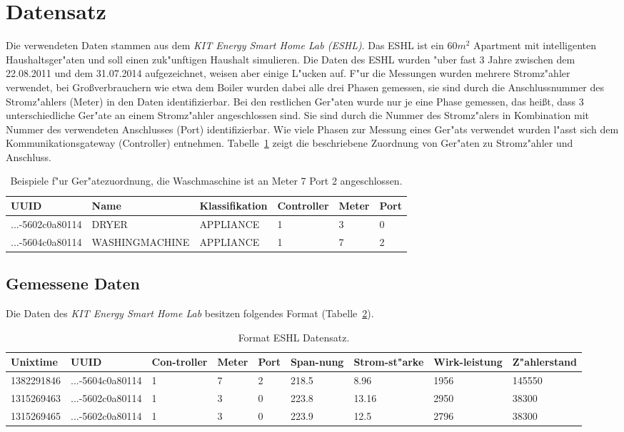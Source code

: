 \section{Datensatz}
\label{Datensatz}

Die verwendeten Daten stammen aus dem \textit{KIT Energy Smart Home Lab (ESHL)}. Das ESHL ist ein $60 m^2$ Apartment mit intelligenten Haushaltsger"aten und soll einen zuk"unftigen Haushalt simulieren. Die Daten des ESHL wurden "uber fast 3 Jahre zwischen dem 22.08.2011 und dem 31.07.2014 aufgezeichnet, weisen aber einige L"ucken auf. F"ur die Messungen wurden mehrere Stromz"ahler verwendet, bei Gro{\ss}verbrauchern wie etwa dem Boiler wurden dabei alle drei Phasen gemessen, sie sind durch die Anschlussnummer des Stromz"ahlers (Meter) in den Daten identifizierbar. Bei den restlichen Ger"aten wurde nur je eine Phase gemessen, das hei{\ss}t, dass  3 unterschiedliche Ger"ate an einem Stromz"ahler angeschlossen sind. Sie sind durch die Nummer des Stromz"alers in Kombination mit Nummer des verwendeten Anschlusses (Port) identifizierbar. Wie viele Phasen zur Messung eines Ger"ats verwendet wurden l"asst sich dem Kommunikationsgateway (Controller) entnehmen.
Tabelle~\ref{uuid} zeigt die beschriebene Zuordnung von Ger"aten zu Stromz"ahler und Anschluss.
\begin{table}[h]
\begin{tabular}{l|l|l|l|l|l}
UUID & Name & Klassifikation & Controller & Meter & Port \\
\hline
...-5602c0a80114 & DRYER & APPLIANCE & 1 & 3 & 0 \\
...-5604c0a80114 & WASHINGMACHINE & APPLIANCE & 1 & 7 & 2
\end{tabular}
\caption["Ubersicht Ger"atezuordnung]{Beispiele f"ur Ger"atezuordnung, die Waschmaschine ist an Meter 7 Port 2 angeschlossen.}
\label{uuid}
\end{table}



\subsection{Gemessene Daten}
\label{Gemessene Daten}

Die Daten des \textit{KIT Energy Smart Home Lab} besitzen folgendes Format (Tabelle~\ref{formateshl}). \\
\begin{table}[h]
\begin{tabular}{l|l|p{1cm}|p{1cm}|p{1cm}|p{1cm}|p{1cm}|p{1.2cm}|p{2cm}}
Unixtime & UUID & Con-troller & Meter & Port & Span-nung & Strom-st"arke & Wirk-leistung & Z"ahlerstand \\
\hline
1382291846 & ...-5604c0a80114 & 1 & 7 & 2 & 218.5 & 8.96 & 1956 & 145550  \\
1315269463 & ...-5602c0a80114 & 1 & 3 & 0 & 223.8 & 13.16 & 2950 & 38300 \\
1315269465 & ...-5602c0a80114 & 1 & 3 & 0 & 223.9 & 12.5 & 2796 & 38300
\end{tabular}
\caption[Format ESHL Daten]{Format ESHL Datensatz.}
\label{formateshl}
\end{table}

